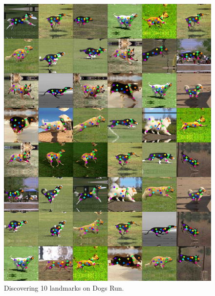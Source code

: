\begin{figure}[t]
	\centering
	\includegraphics[trim={0cm 0cm 0cm 0cm},clip, width=1.\linewidth]{fig/supp/select48dogs}
	\caption{Discovering 10 landmarks on Dogs Run.}
	\label{fig:kp_dogs}
\end{figure}


